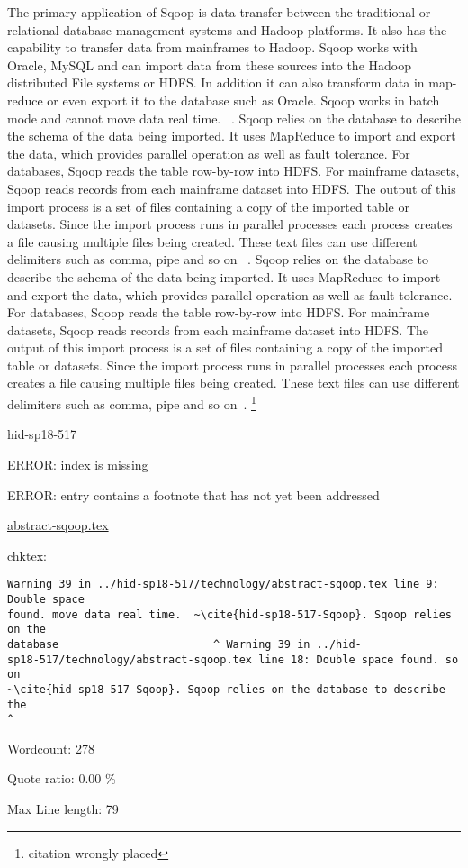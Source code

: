 The primary application of Sqoop is data transfer between the traditional or
relational database management systems and Hadoop platforms. It also has the
capability to transfer data from mainframes to Hadoop. Sqoop works with Oracle,
MySQL and can import data from these sources into the Hadoop distributed File
systems or HDFS. In addition it can also transform data in map-reduce or even
export it to the database such as Oracle.  Sqoop works in batch mode and cannot
move data real time.  ~\cite{hid-sp18-517-Sqoop}. Sqoop relies on the database
to describe the schema of the data being imported. It uses MapReduce to import
and export the data, which provides parallel operation as well as fault
tolerance.  For databases, Sqoop reads the table row-by-row into HDFS.  For
mainframe datasets, Sqoop reads records from each mainframe dataset into
HDFS. The output of this import process is a set of files containing a copy of
the imported table or datasets. Since the import process runs in parallel
processes each process creates a file causing multiple files being
created. These text files can use different delimiters such as comma, pipe and
so on ~\cite{hid-sp18-517-Sqoop}. Sqoop relies on the database to describe the
schema of the data being imported. It uses MapReduce to import and export the
data, which provides parallel operation as well as fault tolerance.  For
databases, Sqoop reads the table row-by-row into HDFS.  For mainframe datasets,
Sqoop reads records from each mainframe dataset into HDFS. The output of this
import process is a set of files containing a copy of the imported table or
datasets. Since the import process runs in parallel processes each process
creates a file causing multiple files being created. These text files can use
different delimiters such as comma, pipe and so on~\cite{hid-sp18-517-Sqoop}.
\footnote{citation wrongly placed}


\begin{IU}

hid-sp18-517

ERROR: index is missing

ERROR: entry contains a footnote that has not yet been addressed

\href{https://github.com/cloudmesh-community/hid-sp18-517/blob/master//technology/abstract-sqoop.tex}{abstract-sqoop.tex}

 
chktex:
\begin{tiny}
\begin{verbatim}
Warning 39 in ../hid-sp18-517/technology/abstract-sqoop.tex line 9: Double space
found. move data real time.  ~\cite{hid-sp18-517-Sqoop}. Sqoop relies on the
database                        ^ Warning 39 in ../hid-
sp18-517/technology/abstract-sqoop.tex line 18: Double space found. so on
~\cite{hid-sp18-517-Sqoop}. Sqoop relies on the database to describe the
^
\end{verbatim}
\end{tiny}

Wordcount: 278


Quote ratio: 0.00 \%
 
Max Line length: 79
\end{IU}

